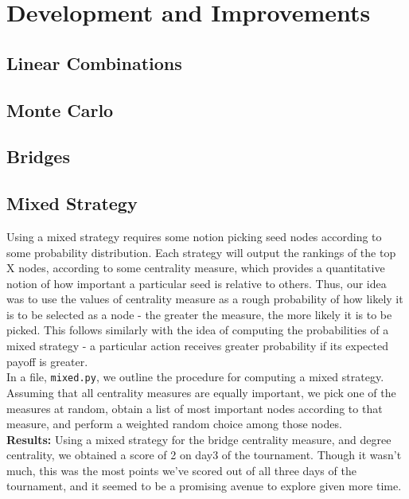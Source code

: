 \documentclass{article}
\begin{document}
    
\section{Development and Improvements}

\subsection*{Linear Combinations}

\subsection*{Monte Carlo}

\subsection*{Bridges}

\subsection*{Mixed Strategy}
    Using a mixed strategy requires some notion picking seed nodes according to some
    probability distribution. Each strategy will output 
    the rankings of the top X nodes, according to some centrality measure, 
    which provides a quantitative notion of how important a particular seed is relative 
    to others. Thus, our idea was to use the values of centrality measure as a rough
    probability of how likely it is to be selected as a node - the greater the measure,
    the more likely it is to be picked. This follows similarly with the idea of computing
    the probabilities of a mixed strategy - a particular action receives greater 
    probability if its expected payoff is greater. 
    \\
    In a file, \texttt{mixed.py}, we outline the procedure for computing a mixed strategy.
    Assuming that all centrality measures are equally important, we pick one of the
    measures at random, obtain a list of most important nodes according to that measure,
    and perform a weighted random choice among those nodes.
    \\
    \textbf{Results:} Using a mixed strategy for the bridge centrality measure,
    and degree centrality, we obtained a score of 2 on day3 of 
    the tournament. Though it wasn't much,
    this was the most points we've scored out of all three days of the tournament,
    and it seemed to be a promising avenue to explore given more time.
    
\end{document}
